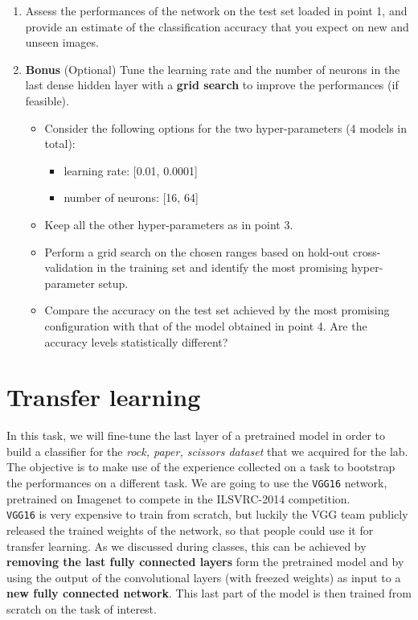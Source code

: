 \documentclass[11pt]{scrartcl}
\begin{document}
\begin{enumerate}
\item Assess the performances of the network on the test set loaded in point 1, and provide an estimate of the classification accuracy that you expect on new and unseen images.
\item \textbf{Bonus} (Optional) Tune the learning rate and the number of neurons in the last dense hidden layer with a \textbf{grid search} to improve the performances (if feasible).
\begin{itemize}
\item Consider the following options for the two hyper-parameters (4 models in total):
\begin{itemize}
\item learning rate: [0.01, 0.0001]
\item number of neurons: [16, 64]
\end{itemize}
\item Keep all the other hyper-parameters as in point 3.
\item Perform a grid search on the chosen ranges based on hold-out cross-validation in the training set and identify the most promising hyper-parameter setup.
\item Compare the accuracy on the test set achieved by the most promising configuration with that of the model obtained in point 4. Are the accuracy levels statistically different?
\end{itemize}
\end{enumerate}

\newpage
\section{Transfer learning}

In this task, we will fine-tune the last layer of a pretrained model in order to build a classifier for the \emph{rock, paper, scissors dataset} that we acquired for the lab. The objective is to make use of the experience collected on a task to bootstrap the performances on a different task. We are going to use the \texttt{VGG16} network, pretrained on Imagenet to compete in the ILSVRC-2014 competition.\\

\texttt{VGG16} is very expensive to train from scratch, but luckily the VGG team publicly released the trained weights of the network, so that people could use it for transfer learning. As we discussed during classes, this can be achieved by \textbf{removing the last fully connected layers} form the pretrained model and by using the output of the convolutional layers (with freezed weights) as input to a \textbf{new fully connected network}. This last part of the model is then trained from scratch on the task of interest.
\end{document}
